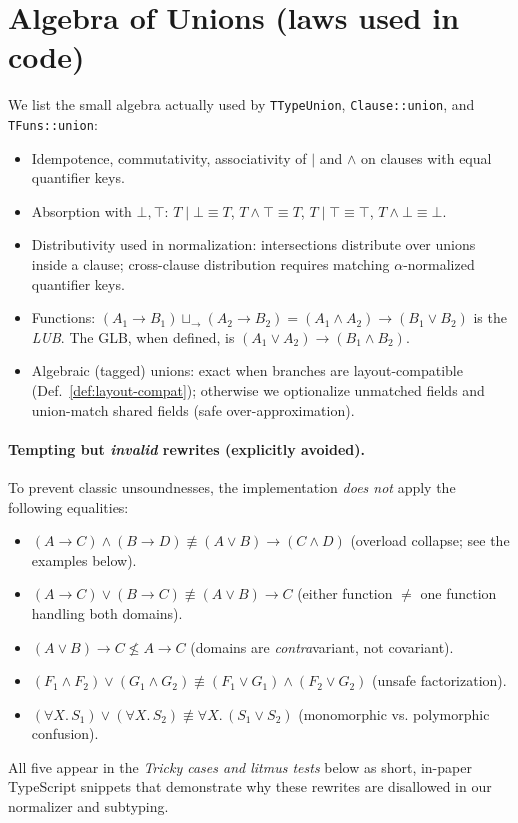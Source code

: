 \documentclass[11pt]{article}
\begin{document}
\section{Algebra of Unions (laws used in code)}
We list the small algebra actually used by \texttt{TTypeUnion}, \texttt{Clause::union}, and \texttt{TFuns::union}:
\begin{itemize}[leftmargin=*]
  \item Idempotence, commutativity, associativity of $\mid$ and $\wedge$ on clauses with equal quantifier keys.
  \item Absorption with $\bot,\top$: $T\mid\bot\equiv T$, $T\wedge\top\equiv T$, $T\mid\top\equiv\top$, $T\wedge\bot\equiv\bot$.
  \item Distributivity used in normalization: intersections distribute over unions inside a clause; cross-clause distribution requires matching $\alpha$-normalized quantifier keys.
  \item Functions: $ (A_1\!\to\!B_1) \sqcup_\to (A_2\!\to\!B_2) = (A_1\wedge A_2)\!\to\!(B_1\vee B_2)$ is the \emph{LUB}. The GLB, when defined, is $(A_1\vee A_2)\!\to\!(B_1\wedge B_2)$.
  \item Algebraic (tagged) unions: exact when branches are layout-compatible (Def.~\ref{def:layout-compat}); otherwise we optionalize unmatched fields and union-match shared fields (safe over-approximation).
\end{itemize}

\paragraph*{Tempting but \emph{invalid} rewrites (explicitly avoided).}
To prevent classic unsoundnesses, the implementation \emph{does not} apply the following equalities:
\begin{itemize}[leftmargin=*]
  \item $(A \to C) \wedge (B \to D) \not\equiv (A \vee B) \to (C \wedge D)$ (overload collapse; see the examples below).
  \item $(A \to C) \vee (B \to C) \not\equiv (A \vee B) \to C$ (either function $\neq$ one function handling both domains).
  \item $(A \vee B) \to C \not\le A \to C$ (domains are \emph{contra}variant, not covariant).
  \item $(F_1 \wedge F_2) \vee (G_1 \wedge G_2) \not\equiv (F_1 \vee G_1) \wedge (F_2 \vee G_2)$ (unsafe factorization).
  \item $(\forall X.\,S_1) \vee (\forall X.\,S_2) \not\equiv \forall X.\,(S_1 \vee S_2)$ (monomorphic vs. polymorphic confusion).
\end{itemize}
All five appear in the \emph{Tricky cases and litmus tests} below as short, in-paper TypeScript snippets that demonstrate why these rewrites are disallowed in our normalizer and subtyping.
\end{document}
